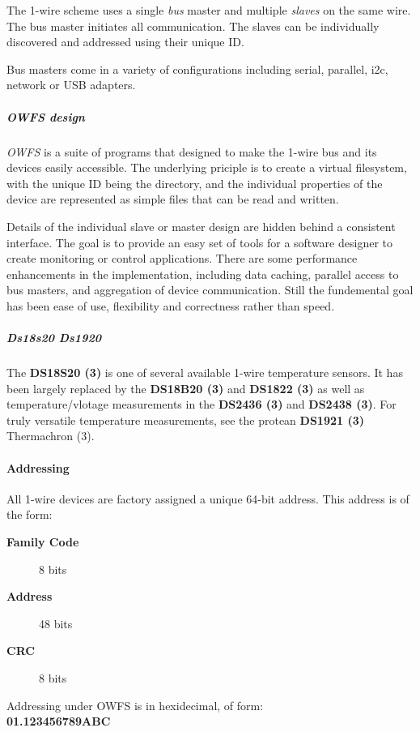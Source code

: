 The 1-wire scheme uses a single  \textit{bus} master and
multiple \textit{slaves} on the same wire. The bus master initiates all communication.
The slaves can be  individually discovered and addressed using their unique
ID. 

Bus masters come in a variety of configurations including serial, parallel,
i2c, network or USB adapters. 
\subparagraph*{OWFS design}\textit{OWFS} is a suite of programs that
designed to make the 1-wire bus and its devices easily accessible. The underlying
priciple is to create a virtual filesystem, with the unique ID being the
directory, and the individual properties of the device are represented
as simple files that can be read and written. 

Details of the individual
slave or master design are hidden behind a consistent interface. The goal
is to  provide an easy set of tools for a software designer to create monitoring
or control applications. There  are some performance enhancements in the
implementation, including data caching, parallel access to bus  masters,
and aggregation of device communication. Still the fundemental goal has
been ease of use, flexibility  and correctness rather than speed.  
\subparagraph*{Ds18s20
Ds1920}The \textsf{\textbf{DS18S20 (3)}} is one of several available 1-wire temperature sensors.
It has been largely replaced by the \textsf{\textbf{DS18B20 (3)}} and \textsf{\textbf{DS1822 (3)}} as well
as temperature/vlotage measurements in the \textsf{\textbf{DS2436 (3)}} and \textsf{\textbf{DS2438 (3)}.} For
truly versatile temperature measurements, see the protean \textsf{\textbf{DS1921 (3)} \textsf{Thermachron
(3)}.} 
\paragraph*{Addressing}
          All 1-wire devices are factory assigned a unique
64-bit address. This address is of the form: \begin{description}
\item [\textbf{Family Code} ] 8 bits 
\item [\textbf{Address} ] 48
bits 
\item [\textbf{CRC} ] 8 bits 
\end{description}


\begin{description}
\item [Addressing under OWFS is in hexidecimal, of form: ] 
\item [\textbf{01.123456789ABC}
] 
\end{description}


